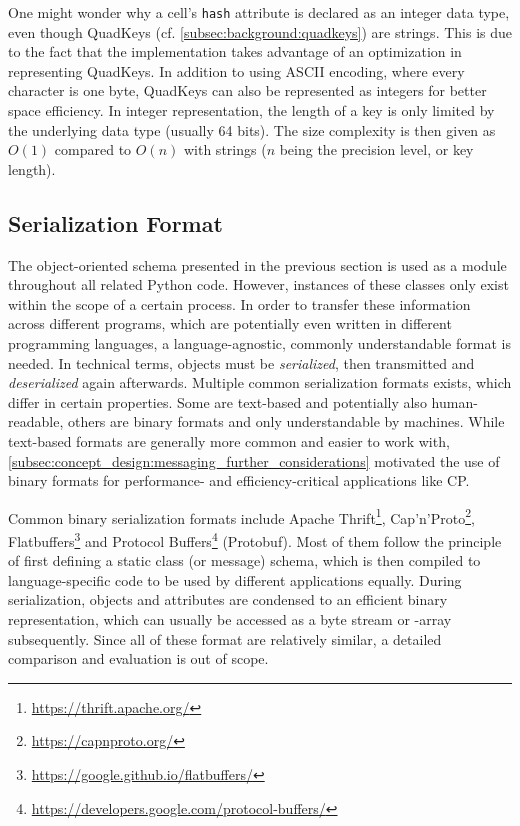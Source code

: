\par
\medskip
One might wonder why a cell's \texttt{hash} attribute is declared as an integer data type, even though QuadKeys (cf. \cref{subsec:background:quadkeys}) are strings. This is due to the fact that the implementation takes advantage of an optimization in representing QuadKeys. In addition to using ASCII encoding, where every character is one byte, QuadKeys can also be represented as integers for better space efficiency. In integer representation, the length of a key is only limited by the underlying data type (usually 64 bits). The size complexity is then given as $O(1)$ compared to $O(n)$ with strings ($n$ being the precision level, or key length).

\subsection{Serialization Format}
\label{subsec:implementation:serialization_format}
The object-oriented schema presented in the previous section is used as a module throughout all related Python code. However, instances of these classes only exist within the scope of a certain process. In order to transfer these information across different programs, which are potentially even written in different programming languages, a language-agnostic, commonly understandable format is needed. In technical terms, objects must be \textit{serialized}, then transmitted and \textit{deserialized} again afterwards. Multiple common serialization formats exists, which differ in certain properties. Some are text-based and potentially also human-readable, others are binary formats and only understandable by machines. While text-based formats are generally more common and easier to work with, \cref{subsec:concept_design:messaging_further_considerations} motivated the use of binary formats for performance- and efficiency-critical applications like CP.

Common binary serialization formats include Apache Thrift\footnote{\url{https://thrift.apache.org/}}, Cap'n'Proto\footnote{\url{https://capnproto.org/}},  Flatbuffers\footnote{\url{https://google.github.io/flatbuffers/}} and Protocol Buffers\footnote{\url{https://developers.google.com/protocol-buffers/}} (Protobuf). Most of them follow the principle of first defining a static class (or message) schema, which is then compiled to language-specific code to be used by different applications equally. During serialization, objects and attributes are condensed to an efficient binary representation, which can usually be accessed as a byte stream or -array subsequently. Since all of these format are relatively similar, a detailed comparison and evaluation is out of scope.

